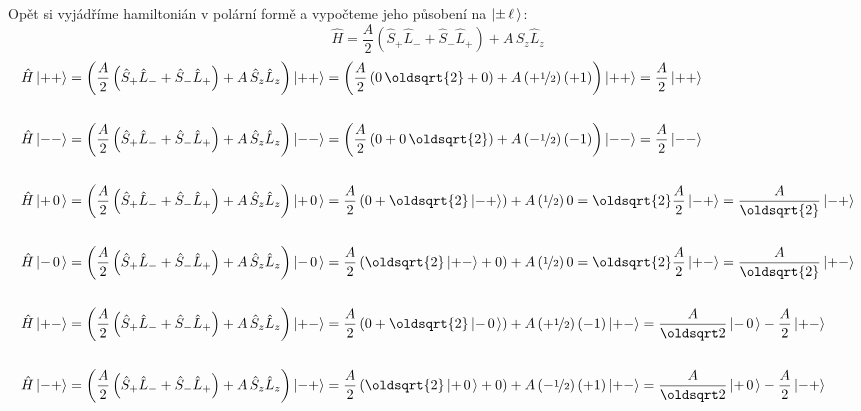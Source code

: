 \documentclass[10pt,a4paper]{article}
\newcommand*{\mask}[2]{%
    \mathord{\makebox[\widthof{\(#1\)}]{\(#2\)}}%
}
\newcommand{\ket}[1]{\left| #1 \right>}
\def\0{\mask{+}{0}}
\begin{document}
Opět si vyjádříme hamiltonián v polární formě a vypočteme jeho působení na $\ket{\pm \mask{+}{\ell}}$:
\begin{equation*}
    \hat H
    = \frac{A}{2} \left(
        \hat S_+ \hat L_- +
        \hat S_- \hat L_+
    \right)
    + A \, \hat S_z \hat L_z
\end{equation*}
\begin{align*}
    \hat H \ket{++}
    &= \left(
        \frac{A}{2} \left(
            \hat S_+ \hat L_- +
            \hat S_- \hat L_+
        \right)
        + A \, \hat S_z \hat L_z
    \right) \ket{++}
    = \left(
        \frac{A}{2} \left(
            0 \, \oldsqrt{2} +
            0
        \right)
        + A \left( +\nicefrac{1}{2} \right) (+1)
    \right) \ket{++}
    = \frac{A}{2} \ket{++}
    \\\\
    \hat H \ket{--}
    &= \left(
        \frac{A}{2} \left(
            \hat S_+ \hat L_- +
            \hat S_- \hat L_+
        \right)
        + A \, \hat S_z \hat L_z
    \right) \ket{--}
    = \left(
        \frac{A}{2} \left(
            0 +
            0 \, \oldsqrt{2}
        \right)
        + A \left( -\nicefrac{1}{2} \right) (-1)
    \right) \ket{--}
    = \frac{A}{2} \ket{--}
    \\\\
    \hat H \ket{+\0}
    &= \left(
        \frac{A}{2} \left(
            \hat S_+ \hat L_- +
            \hat S_- \hat L_+
        \right)
        + A \, \hat S_z \hat L_z
    \right) \ket{+\0}
    =
    \frac{A}{2} \left(
        0 +
        \oldsqrt{2} \ket{-+}
    \right)
    + A \left( \nicefrac{1}{2} \right) 0
    = \oldsqrt{2} \frac{A}{2} \ket{-+}
    = \frac{A}{\oldsqrt{2}} \ket{-+}
    \\\\
    \hat H \ket{-\0}
    &= \left(
        \frac{A}{2} \left(
            \hat S_+ \hat L_- +
            \hat S_- \hat L_+
        \right)
        + A \, \hat S_z \hat L_z
    \right) \ket{-\0}
    =
    \frac{A}{2} \left(
        \oldsqrt{2} \ket{+-}
        + 0
    \right)
    + A \left( \nicefrac{1}{2} \right) 0
    = \oldsqrt{2} \frac{A}{2} \ket{+-}
    = \frac{A}{\oldsqrt{2}} \ket{+-}
    \\\\
    \hat H \ket{+-}
    &= \left(
        \frac{A}{2} \left(
            \hat S_+ \hat L_- +
            \hat S_- \hat L_+
        \right)
        + A \, \hat S_z \hat L_z
    \right) \ket{+-}
    =
    \frac{A}{2} \left(
        0 +
        \oldsqrt{2} \ket{-\0}
    \right)
    + A \left( +\nicefrac{1}{2} \right) (-1) \ket{+-}
    = \frac{A}{\oldsqrt 2} \ket{-\0} - \frac{A}{2} \ket{+-}
    \\\\
    \hat H \ket{-+}
    &= \left(
        \frac{A}{2} \left(
            \hat S_+ \hat L_- +
            \hat S_- \hat L_+
        \right)
        + A \, \hat S_z \hat L_z
    \right) \ket{-+}
    =
    \frac{A}{2} \left(
        \oldsqrt{2} \ket{+\0}
        + 0
    \right)
    + A \left( -\nicefrac{1}{2} \right) (+1) \ket{+-}
    = \frac{A}{\oldsqrt 2} \ket{+\0} - \frac{A}{2} \ket{-+}
\end{align*}
\end{document}
